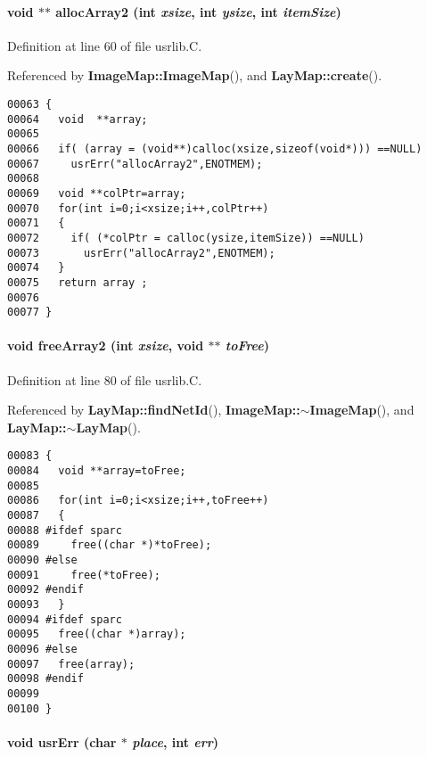 \paragraph{\setlength{\rightskip}{0pt plus 5cm}void $\ast$$\ast$ alloc\-Array2 (int {\em xsize}, int {\em ysize}, int {\em item\-Size})}\hfill



Definition at line 60 of file usrlib.C.

Referenced by {\bf Image\-Map::Image\-Map}(), and {\bf Lay\-Map::create}().\small\begin{verbatim}00063 {
00064   void  **array;
00065 
00066   if( (array = (void**)calloc(xsize,sizeof(void*))) ==NULL)
00067     usrErr("allocArray2",ENOTMEM);
00068   
00069   void **colPtr=array;
00070   for(int i=0;i<xsize;i++,colPtr++)
00071   {
00072     if( (*colPtr = calloc(ysize,itemSize)) ==NULL)
00073       usrErr("allocArray2",ENOTMEM);
00074   }
00075   return array ;
00076 
00077 }
\end{verbatim}\normalsize 
\label{usrlib.h_a15}
\paragraph{\setlength{\rightskip}{0pt plus 5cm}void free\-Array2 (int {\em xsize}, void $\ast$$\ast$ {\em to\-Free})}\hfill



Definition at line 80 of file usrlib.C.

Referenced by {\bf Lay\-Map::find\-Net\-Id}(), {\bf Image\-Map::$\sim$Image\-Map}(), and {\bf Lay\-Map::$\sim$Lay\-Map}().\small\begin{verbatim}00083 {
00084   void **array=toFree;
00085 
00086   for(int i=0;i<xsize;i++,toFree++)
00087   {
00088 #ifdef sparc
00089     free((char *)*toFree);
00090 #else
00091     free(*toFree);
00092 #endif
00093   }
00094 #ifdef sparc
00095   free((char *)array);
00096 #else
00097   free(array);
00098 #endif
00099 
00100 }
\end{verbatim}\normalsize 
\label{usrlib.h_a12}
\paragraph{\setlength{\rightskip}{0pt plus 5cm}void usr\-Err (char $\ast$ {\em place}, int {\em err})}\hfill



